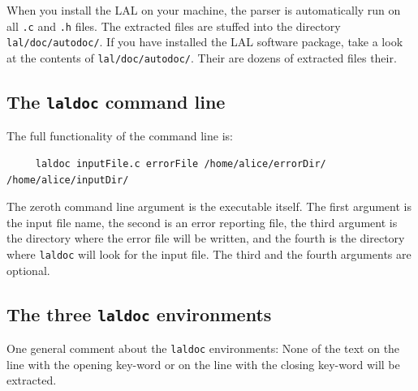 \documentclass[oneside]{book}
\begin{document}
When you install the LAL on your machine, the parser is automatically
run on all {\tt .c} and {\tt .h} files. The extracted files are
stuffed into the directory {\tt lal/doc/autodoc/}.  If you have
installed the LAL software package, take a look at the contents of
{\tt lal/doc/autodoc/}. Their are dozens of extracted files their.

\subsection{ The {\texttt {laldoc}} command line }
The full functionality of the command line is:
\begin{verbatim}
     laldoc inputFile.c errorFile /home/alice/errorDir/ /home/alice/inputDir/
\end{verbatim}
\noindent
The zeroth command line argument is the executable itself.
The first argument is the input file name, the second is an error reporting
file, the third argument is the directory where the error file will be
written, and the fourth is the directory where {\tt laldoc} will look
for the input file.  The third and the fourth arguments are optional.


\subsection{ The three {\texttt {laldoc}} environments }

One general comment about the  {\texttt {laldoc}} environments:
None of the text on the line with the opening key-word or on the
line with the closing key-word will be extracted.
\end{document}
